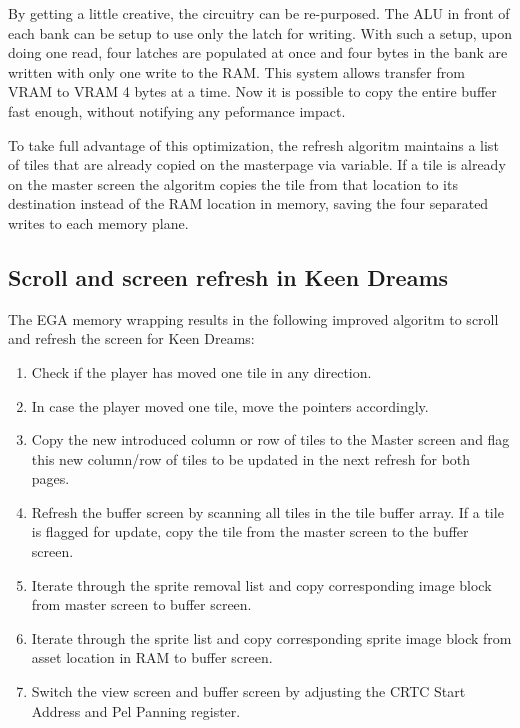 \documentclass[book.tex]{subfiles}
\begin{document}
\par
By getting a little creative, the circuitry can be re-purposed. The ALU in front of each bank can be setup to use only the latch for writing. With such a setup, upon doing one read, four latches are populated at once and four bytes in the bank are written with only one write to the RAM. This system allows transfer from VRAM to VRAM 4 bytes at a time. Now it is possible to copy the entire buffer fast enough, without notifying any peformance impact.\\
\par
\begin{minipage}{\textwidth}
  
  \end{minipage}
  \label{ega_latch_copy}
  \par

To take full advantage of this optimization, the refresh algoritm maintains a list of tiles that are already copied on the masterpage via  variable. If a tile is already on the master screen the algoritm copies the tile from that location to its destination instead of the RAM location in memory, saving the four separated writes to each memory plane.\\




\subsection{Scroll and screen refresh in Keen Dreams} \label{section:scroll_refresh_dreams}

The EGA memory wrapping results in the following improved algoritm to scroll and refresh the screen for Keen Dreams:
\begin{enumerate}
\item Check if the player has moved one tile in any direction.
\item In case the player moved one tile, move the  pointers accordingly. 
\item Copy the new introduced column or row of tiles to the Master screen and flag this new column/row of tiles to be updated in the next refresh for both pages. 
\item Refresh the buffer screen by scanning all tiles in the tile buffer array. If a tile is flagged for update, copy the tile from the master screen to the buffer screen.
\item Iterate through the sprite removal list and copy corresponding image block from master screen to buffer screen. 
\item Iterate through the sprite list and copy corresponding sprite image block from asset location in RAM to buffer screen.
\item Switch the view screen and buffer screen by adjusting the CRTC Start Address and Pel Panning register.
\end{enumerate}
\end{document}
